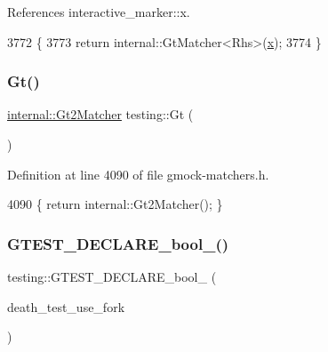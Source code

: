 References interactive\+\_\+marker\+::x.


\begin{DoxyCode}
3772                                         \{
3773   \textcolor{keywordflow}{return} internal::GtMatcher<Rhs>(\hyperlink{namespaceinteractive__marker_acda52804aef30b460a72fb21ee01d69d}{x});
3774 \}
\end{DoxyCode}
\mbox{\label{namespacetesting_a3eaae6408f77ba7d87ca2d6a21dbde77}} 
\subsubsection{\texorpdfstring{Gt()}{Gt()}\hspace{0.1cm}{\footnotesize\ttfamily [2/2]}}
{\footnotesize\ttfamily \hyperlink{classtesting_1_1internal_1_1Gt2Matcher}{internal\+::\+Gt2\+Matcher} testing\+::\+Gt (\begin{DoxyParamCaption}{ }\end{DoxyParamCaption})\hspace{0.3cm}{\ttfamily [inline]}}



Definition at line 4090 of file gmock-\/matchers.\+h.


\begin{DoxyCode}
4090 \{ \textcolor{keywordflow}{return} internal::Gt2Matcher(); \}
\end{DoxyCode}
\mbox{\label{namespacetesting_a534f0743e7c42c55d27dcd0dd3d38f18}} 
\subsubsection{\texorpdfstring{G\+T\+E\+S\+T\+\_\+\+D\+E\+C\+L\+A\+R\+E\+\_\+bool\+\_\+()}{GTEST\_DECLARE\_bool\_()}\hspace{0.1cm}{\footnotesize\ttfamily [1/9]}}
{\footnotesize\ttfamily testing\+::\+G\+T\+E\+S\+T\+\_\+\+D\+E\+C\+L\+A\+R\+E\+\_\+bool\+\_\+ (\begin{DoxyParamCaption}\item[{death\+\_\+test\+\_\+use\+\_\+fork}]{ }\end{DoxyParamCaption})}

